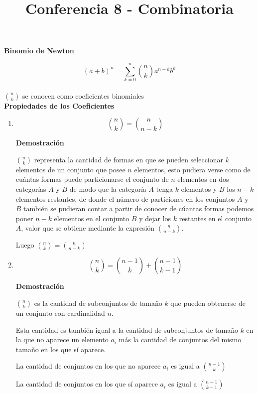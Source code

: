 \documentclass[a4paper,12pt]{report}
\title{Conferencia 8 - Combinatoria}
\author{}
\begin{document}
\maketitle




\textbf{Binomio de Newton}

$$(a+b)^n = \sum^n_{k=0} \binom{n}{k}  a^{n-k}b^k$$\\

${n}\choose{k}$ se conocen como coeficientes binomiales\\

\textbf{Propiedades de los Coeficientes}

\begin{enumerate}
 \item  $$\binom{n}{k}=\binom{n}{n-k}$$
 
 \textbf{Demostración}
 
 $\binom{n}{k}$ representa la cantidad de formas en que se pueden seleccionar $k$ elementos de un conjunto que posee $n$ elementos, esto pudiera verse 
 como de cu\'antas formas puede particionarse el conjunto de $n$ elementos en dos categor\'ias $A$ y $B$ de modo que la categor\'ia $A$ tenga $k$ elementos y $B$ los $n-k$ elementos restantes,
 de donde el n\'umero de particiones en los conjuntos $A$ y $B$ tambi\'en se pudieran contar a partir de conocer de c\'uantas formas podemos poner $n-k$ elementos en el conjunto $B$ y dejar los $k$ restantes en el conjunto $A$, valor que se obtiene 
 mediante la expresi\'on ${n}\choose{n-k}$.

 Luego ${n}\choose{k}$$=$${n}\choose{n-k}$
 
 \item $$\binom{n}{k}=\binom{n-1}{k}+\binom{n-1}{k-1}$$
 
 \textbf{Demostración}
 
 ${n}\choose{k}$ es la cantidad de subconjuntos de tamaño $k$ que pueden obtenerse de un conjunto con cardinalidad $n$.
 
 Esta cantidad es también igual a la cantidad de subconjuntos de tamaño $k$ en la que no aparece un elemento $a_i$ más la cantidad de conjuntos del mismo tamaño en los que sí aparece.
 
 La cantidad de conjuntos en los que no aparece $a_i$ es igual a ${n-1}\choose{k}$
 
 La cantidad de conjuntos en los que sí aparece $a_i$ es igual a ${n-1}\choose{k-1}$
 

\end{enumerate}
\end{document}
